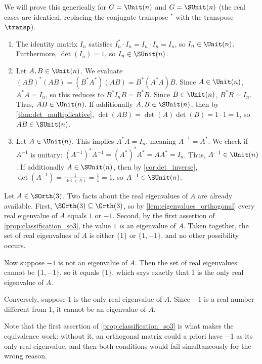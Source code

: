 \begin{exercisesolution}
\label{sol:group_properties}
We will prove this generically for $G = \Unit(n)$ and $G = \SUnit(n)$ (the real cases are identical, replacing the conjugate transpose $^*$ with the transpose $\transp$).
\begin{enumerate}[label=\textbf{(\alph*)}]
    \item The identity matrix $I_n$ satisfies $I_n^* \cdot I_n = I_n \cdot I_n = I_n$, so $I_n \in \Unit(n)$. Furthermore, $\det(I_n) = 1$, so $I_n \in \SUnit(n)$.
    
    \item Let $A, B \in \Unit(n)$. We evaluate $(AB)^* (AB) = (B^* A^*) (AB) = B^* (A^* A) B$. Since $A \in \Unit(n)$, $A^* A = I_n$, so this reduces to $B^* I_n B = B^* B$. Since $B \in \Unit(n)$, $B^* B = I_n$. Thus, $AB \in \Unit(n)$. 
    If additionally $A, B \in \SUnit(n)$, then by \cref{thm:det_multiplicative}, $\det(AB) = \det(A)\det(B) = 1 \cdot 1 = 1$, so $AB \in \SUnit(n)$.
    
    \item Let $A \in \Unit(n)$. This implies $A^* A = I_n$, meaning $A^{-1} = A^*$. We check if $A^{-1}$ is unitary: $(A^{-1})^* A^{-1} = (A^*)^* A^* = A A^* = I_n$. Thus, $A^{-1} \in \Unit(n)$. 
    If additionally $A \in \SUnit(n)$, then by \cref{cor:det_inverse}, $\det(A^{-1}) = \frac{1}{\det(A)} = \frac{1}{1} = 1$, so $A^{-1} \in \SUnit(n)$.
\end{enumerate}
\end{exercisesolution}

\begin{exercisesolution}
\label{sol:why_only_real_eigenvalue}
Let $A \in \SOrth(3)$. Two facts about the real eigenvalues of $A$ are already available. First, $\SOrth(3) \subseteq \Orth(3)$, so by \cref{lem:eigenvalues_orthogonal} every real eigenvalue of $A$ equals $1$ or $-1$. Second, by the first assertion of \cref{prop:classification_so3}, the value $1$ \emph{is} an eigenvalue of $A$. Taken together, the set of real eigenvalues of $A$ is either $\{1\}$ or $\{1, -1\}$, and no other possibility occurs.

Now suppose $-1$ is not an eigenvalue of $A$. Then the set of real eigenvalues cannot be $\{1, -1\}$, so it equals $\{1\}$, which says exactly that $1$ is the only real eigenvalue of $A$.

Conversely, suppose $1$ is the only real eigenvalue of $A$. Since $-1$ is a real number different from $1$, it cannot be an eigenvalue of $A$.

Note that the first assertion of \cref{prop:classification_so3} is what makes the equivalence work: without it, an orthogonal matrix could a priori have $-1$ as its only real eigenvalue, and then both conditions would fail simultaneously for the wrong reason.
\end{exercisesolution}

